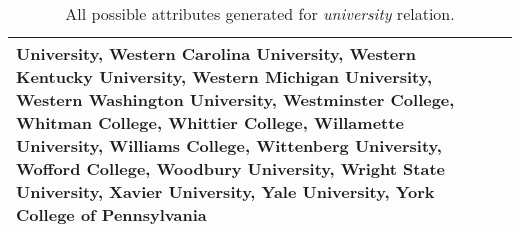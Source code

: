 \begin{table*}
{\begin{tabular}{lp{21cm}}
University, Western Carolina University, Western Kentucky University, Western Michigan University, Western Washington University, Westminster College, Whitman College, Whittier College, Willamette University, Williams College, Wittenberg University, Wofford College, Woodbury University, Wright State University, Xavier University, Yale University, York College of Pennsylvania
            \\ \hline
        \end{tabular}
    }
    \caption{All possible attributes generated for \textit{university} relation.}
    \label{tab:university}
\end{table*}